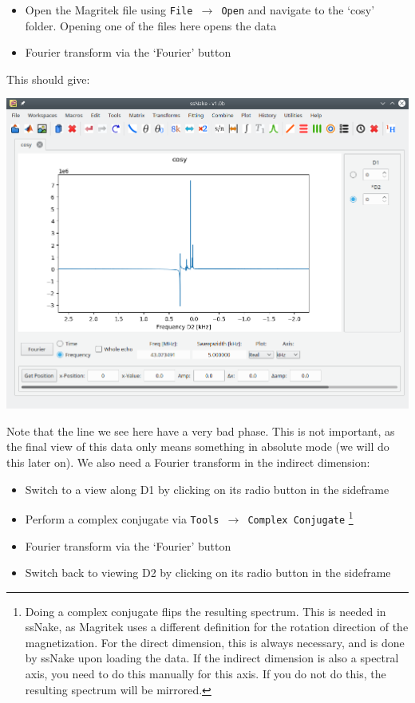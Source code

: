 \documentclass[11pt,a4paper]{article}
\begin{document}
\begin{itemize}
  \item Open the Magritek file using \texttt{File $\longrightarrow$ Open} and navigate to the `cosy' folder. Opening one of the files here opens the data
  \item Fourier transform via the `Fourier' button
\end{itemize}
This should give:
\begin{center}
\includegraphics[width=0.8\linewidth]{Figs/Fig1.png}
\end{center}
Note that the line we see here have a very bad phase.
This is not important, as the final view of this data only means something in absolute mode (we will do this later on).
We also need a Fourier transform in the indirect dimension:

\begin{itemize}
  \item Switch to a view along D1 by clicking on its radio button in the sideframe
  \item Perform a complex conjugate via \texttt{Tools $\longrightarrow$ Complex Conjugate} \footnote{Doing
	 a complex conjugate flips the resulting spectrum. This is needed in ssNake, as Magritek uses a
	 different definition for the rotation direction of the magnetization. For the direct dimension,
	 this is always necessary, and is done by ssNake upon loading the data. If the indirect dimension
  is also a spectral axis, you need to do this manually for this axis. If you do not do this, the
resulting spectrum will be mirrored.}
  \item Fourier transform via the `Fourier' button
  \item Switch back to viewing D2 by clicking on its radio button in the sideframe
\end{itemize}
\end{document}
